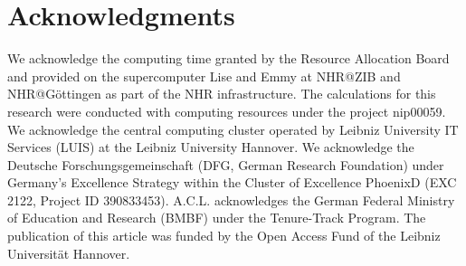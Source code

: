 \documentclass[aps,prl,twocolumn,superscriptaddress,longbibliography]{revtex4-1}
\begin{document}
\section{Acknowledgments} 
We acknowledge the computing time granted by the Resource Allocation Board and provided on the supercomputer Lise and Emmy at NHR@ZIB and NHR@Göttingen as part of the NHR infrastructure. The calculations for this research were conducted with computing resources under the project nip00059. We acknowledge the central computing cluster operated by Leibniz University IT Services (LUIS) at the Leibniz University Hannover. We acknowledge the Deutsche Forschungsgemeinschaft (DFG, German Research Foundation) under Germany’s Excellence Strategy within the Cluster of Excellence PhoenixD (EXC 2122, Project ID 390833453). A.C.L. acknowledges the German Federal Ministry of Education and Research (BMBF) under the Tenure-Track Program. The publication of this article was funded by the Open Access Fund of the Leibniz Universität Hannover.



\end{document}
